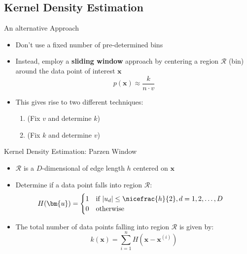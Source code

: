 \subsection{Kernel Density Estimation}

\begin{frame}{An alternative Approach}{}
	\begin{itemize}
		\item Don't use a fixed number of pre-determined bins
		\item Instead, employ a \textbf{sliding window} approach by centering a region $\mathcal{R}$ (bin)
			around the data point of interest $\bm{x}$
		\begin{equation}
			p(\bm{x}) \approx \frac{k}{n \cdot v}
		\end{equation}
		\item This gives rise to two different techniques:
		\begin{enumerate}
			\item {} (Fix $v$ and determine $k$)
			\item {} (Fix $k$ and determine $v$)
		\end{enumerate}
	\end{itemize}
\end{frame}


\begin{frame}{Kernel Density Estimation: Parzen Window}{}\important
	\begin{itemize}
		\item $\mathcal{R}$ is a $D$-dimensional  of edge length $h$ centered on $\bm{x}$
		\item Determine if a data point falls into region $\mathcal{R}$:
		\begin{equation}
			H(\bm{u}) = \begin{cases} 
				1\quad \text{if}\ \vert u_d \vert \le \nicefrac{h}{2}, d = 1, 2, \dots, D \\
				0\quad \text{otherwise}
			\end{cases}
		\end{equation}
		\item The total number of data points falling into region $\mathcal{R}$ is given by:
		\begin{equation}
			k(\bm{x}) = \sum_{i=1}^n H(\bm{x} - \bm{x}^{(i)})
		\end{equation}
	\end{itemize}
\end{frame}


